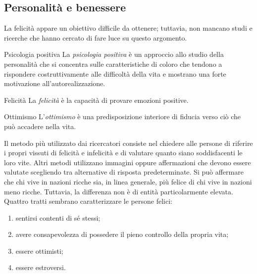 \documentclass[a4paper]{article}
\begin{document}
\subsection{Personalità e benessere}
La felicità appare un obiettivo difficile da ottenere; tuttavia, non mancano studi e ricerche che hanno cercato di fare luce su questo argomento.
\begin{snippetdefinition}{Psicologia positiva}
    La \emph{psicologia positiva} è un approccio allo studio della personalità che si concentra sulle caratteristiche di coloro che tendono a rispondere costruttivamente alle difficoltà della vita e mostrano una forte motivazione all'autorealizzazione.
\end{snippetdefinition}
\begin{snippetdefinition}{Felicità}
    La \emph{felicità} è la capacità di provare emozioni positive.
\end{snippetdefinition}
\begin{snippetdefinition}{Ottimismo}
    L'\emph{ottimismo} è una predisposizione interiore di fiducia verso ciò che può accadere nella vita.
\end{snippetdefinition}
Il metodo più utilizzato dai ricercatori consiste nel chiedere alle persone di riferire i propri vissuti di felicità e infelicità e di valutare quanto siano soddisfacenti le loro vite.
Altri metodi utilizzano immagini oppure affermazioni che devono essere valutate scegliendo tra alternative di risposta predeterminate.
Si può affermare che chi vive in nazioni ricche sia, in linea generale, più felice di chi vive in nazioni meno ricche. Tuttavia, la differenza non è di entità particolarmente elevata.
Quattro tratti sembrano caratterizzare le persone felici:
\begin{enumerate}
    \item sentirsi contenti di sé stessi;
    \item avere consapevolezza di possedere il pieno controllo della propria vita;
    \item essere ottimisti;
    \item essere estroversi.
\end{enumerate}
\end{document}
